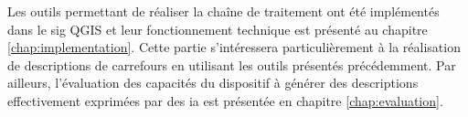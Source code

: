 \newpar{}

Les outils permettant de réaliser la chaîne de traitement ont été implémentés dans le \gls{sig} QGIS et leur fonctionnement technique est présenté au chapitre \ref{chap:implementation}. Cette partie s'intéressera particulièrement à la réalisation de descriptions de carrefours en utilisant les outils présentés précédemment. Par ailleurs, l'évaluation des capacités du dispositif à générer des descriptions effectivement exprimées par des \gls{ia} est présentée en chapitre \ref{chap:evaluation}.